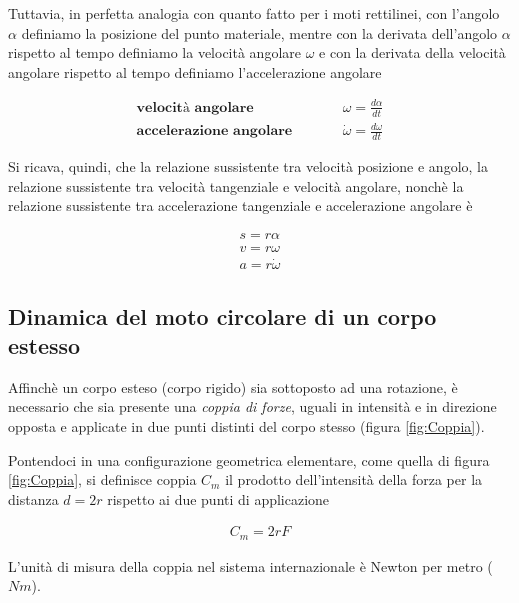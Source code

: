 \documentclass[17pt]{extarticle}
\begin{document}
Tuttavia, in perfetta analogia con quanto fatto per i moti rettilinei, con l'angolo $\alpha$ definiamo la posizione del punto materiale, mentre con la derivata dell'angolo $\alpha$ rispetto al tempo definiamo la velocità angolare $\omega$ e con la derivata della velocità angolare rispetto al tempo definiamo l'accelerazione angolare

\begin{eqnarray}
	\textbf{velocità angolare} &\qquad & \omega = \frac{d\alpha}{dt}\\
	\textbf{accelerazione angolare} &\qquad & \dot{\omega} = \frac{d \omega}{dt}
\end{eqnarray}


Si ricava, quindi, che la relazione sussistente tra velocità posizione e angolo, la relazione sussistente tra velocità tangenziale e velocità angolare, nonchè la relazione sussistente tra accelerazione tangenziale e accelerazione angolare è

\begin{eqnarray}
	s = r\alpha \\ \label{eq:velAng}
	v = r\omega \\ \label{eq:accAng}
	a = r\dot{\omega}
\end{eqnarray} 






\subsection{Dinamica del moto circolare di un corpo estesso}\label{cap:corpoRigido}

Affinchè un corpo esteso (corpo rigido) sia sottoposto ad una rotazione, è necessario che sia presente una \emph{coppia di forze}, uguali in intensità e in direzione opposta e applicate in due punti distinti del corpo stesso (figura \ref{fig:Coppia}). 

Pontendoci in una configurazione geometrica elementare, come quella di figura \ref{fig:Coppia}, si definisce coppia $C_m$ il prodotto dell'intensità della forza per la distanza $d = 2r$ rispetto ai due punti di applicazione

\begin{eqnarray}
	C_m = 2rF
\end{eqnarray}

L'unità di misura della coppia nel sistema internazionale è Newton per metro ($Nm$).

\end{document}
